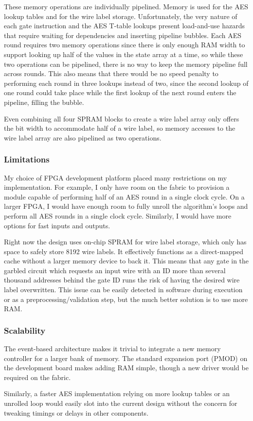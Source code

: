 These memory operations are individually pipelined. Memory is used for the AES lookup tables and for the wire label storage. Unfortunately, the very nature of each gate instruction and the AES T-table lookups present load-and-use hazards that require waiting for dependencies and inserting pipeline bubbles. Each AES round requires two memory operations since there is only enough RAM width to support looking up half of the values in the state array at a time, so while these two operations can be pipelined, there is no way to keep the memory pipeline full across rounds. This also means that there would be no speed penalty to performing each round in three lookups instead of two, since the second lookup of one round could take place while the first lookup of the next round enters the pipeline, filling the bubble.

Even combining all four SPRAM blocks to create a wire label array only offers the bit width to accommodate half of a wire label, so memory accesses to the wire label array are also pipelined as two operations.

\subsubsection{Limitations}
My choice of FPGA development platform placed many restrictions on my implementation. For example, I only have room on the fabric to provision a module capable of performing half of an AES round in a single clock cycle. On a larger FPGA, I would have enough room to fully unroll the algorithm's loops and perform all AES rounds in a single clock cycle. Similarly, I would have more options for fast inputs and outputs.

Right now the design uses on-chip SPRAM for wire label storage, which only has space to safely store 8192 wire labels. It effectively functions as a direct-mapped cache without a larger memory device to back it. This means that any gate in the garbled circuit which requests an input wire with an ID more than several thousand addresses behind the gate ID runs the risk of having the desired wire label overwritten. This issue can be easily detected in software during execution or as a preprocessing/validation step, but the much better solution is to use more RAM.

\subsubsection{Scalability}
The event-based architecture makes it trivial to integrate a new memory controller for a larger bank of memory. The standard expansion port (PMOD) on the development board makes adding RAM simple, though a new driver would be required on the fabric.

Similarly, a faster AES implementation relying on more lookup tables or an unrolled loop would easily slot into the current design without the concern for tweaking timings or delays in other components.
